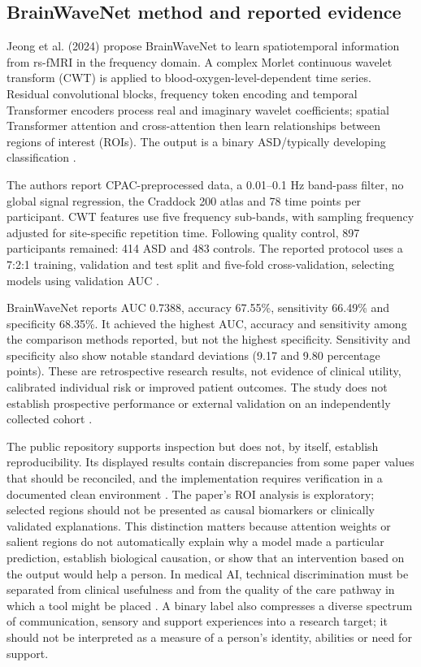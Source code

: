 \documentclass[11pt,a4paper]{article}
\let\cite\parencite
\begin{document}
\subsection{BrainWaveNet method and reported evidence}
Jeong et al. (2024) propose BrainWaveNet to learn spatiotemporal information from rs-fMRI in the frequency domain. A complex Morlet continuous wavelet transform (CWT) is applied to blood-oxygen-level-dependent time series. Residual convolutional blocks, frequency token encoding and temporal Transformer encoders process real and imaginary wavelet coefficients; spatial Transformer attention and cross-attention then learn relationships between regions of interest (ROIs). The output is a binary ASD/typically developing classification \cite{jeong2024}.

The authors report CPAC-preprocessed data, a 0.01--0.1 Hz band-pass filter, no global signal regression, the Craddock 200 atlas and 78 time points per participant. CWT features use five frequency sub-bands, with sampling frequency adjusted for site-specific repetition time. Following quality control, 897 participants remained: 414 ASD and 483 controls. The reported protocol uses a 7:2:1 training, validation and test split and five-fold cross-validation, selecting models using validation AUC \cite{jeong2024}.

BrainWaveNet reports AUC 0.7388, accuracy 67.55\%, sensitivity 66.49\% and specificity 68.35\%. It achieved the highest AUC, accuracy and sensitivity among the comparison methods reported, but not the highest specificity. Sensitivity and specificity also show notable standard deviations (9.17 and 9.80 percentage points). These are retrospective research results, not evidence of clinical utility, calibrated individual risk or improved patient outcomes. The study does not establish prospective performance or external validation on an independently collected cohort \cite{jeong2024}.

The public repository supports inspection but does not, by itself, establish reproducibility. Its displayed results contain discrepancies from some paper values that should be reconciled, and the implementation requires verification in a documented clean environment \cite{brainwavenetcode}. The paper's ROI analysis is exploratory; selected regions should not be presented as causal biomarkers or clinically validated explanations. This distinction matters because attention weights or salient regions do not automatically explain why a model made a particular prediction, establish biological causation, or show that an intervention based on the output would help a person. In medical AI, technical discrimination must be separated from clinical usefulness and from the quality of the care pathway in which a tool might be placed \cite{topol2019,who2021}. A binary label also compresses a diverse spectrum of communication, sensory and support experiences into a research target; it should not be interpreted as a measure of a person's identity, abilities or need for support.
\end{document}
